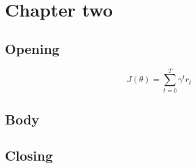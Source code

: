 \chapter{Chapter two}
\section{Opening}
\lipsum[1-40]
\begin{equation}
  J(\theta) = \sum_{t=0}^{T} \gamma^t r_t
\end{equation}
\section{Body}
\lipsum[41-80]
\section{Closing}
\lipsum[81-110]
